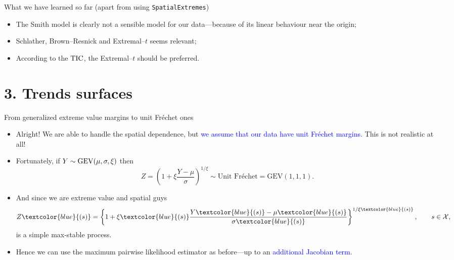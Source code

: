 \documentclass[mode=present,style=simple,paper=screen]{powerdot}
\theoremstyle{plain}%
\theoremstyle{definition}
\theoremstyle{remark}
\begin{document}
\begin{slide}[toc=Debrief \#2]{What we have learned so far (apart from
    using \texttt{SpatialExtremes})}
  \begin{itemize}
  \item The Smith model is clearly not a sensible model for our
    data---because of its linear behaviour near the origin;
  \item Schlather, Brown--Resnick and Extremal--$t$ seems relevant;
  \item According to the ${\rm TIC}$, the Extremal--$t$ should be
    preferred.
  \end{itemize}
\end{slide}

\section{3. Trends surfaces}

\begin{slide}[toc=]{From generalized extreme value margins to unit
    Fréchet ones}
  \begin{itemize}
  \item Alright! We are able to handle the spatial dependence, but
    \textcolor{blue}{we assume that our data have unit Fréchet
      margins}. This is not realistic at all!
  \item Fortunately, if $Y \sim {\rm GEV}(\mu, \sigma, \xi)$ then
    \begin{equation*}
      Z = \left(1 + \xi \frac{Y - \mu}{\sigma} \right)^{1 / \xi} \sim
      \text{Unit Fréchet}=\mbox{GEV}(1,1,1).
    \end{equation*}
    \pause
  \item And since we are extreme value and spatial guys
    \begin{equation*}
      Z\textcolor{blue}{(s)} = \left\{1 + \xi\textcolor{blue}{(s)}
        \frac{Y\textcolor{blue}{(s)} -
          \mu\textcolor{blue}{(s)}}{\sigma\textcolor{blue}{(s)}}
      \right\}^{1 / \xi\textcolor{blue}{(s)}}, \qquad s \in \mathcal{X},
    \end{equation*}
    is a simple max-stable process.
  \item Hence we can use the maximum pairwise likelihood estimator as
    before---up to an \textcolor{blue}{additional Jacobian term}.
  \end{itemize}
\end{slide}
\end{document}
